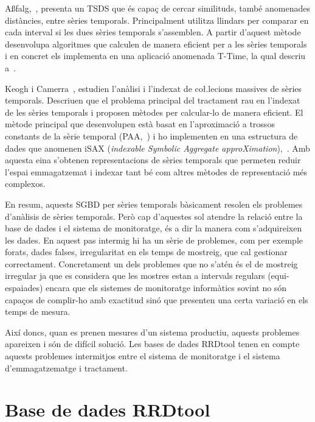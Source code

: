 A{\ss}falg,~\cite{assfalg08:_advan_analy_temp}, presenta un TSDS que és capaç de
cercar similituds, també anomenades distàncies, entre sèries temporals. Principalment utilitza llindars per comparar en cada interval si les dues sèries temporals s'assemblen. A partir d'aquest mètode desenvolupa algoritmes que calculen de manera eficient per a les sèries temporals i en concret els implementa en una aplicació anomenada T-Time, la qual descriu a~\cite{assfalg08:ttime}.

Keogh i Camerra~\cite{keogh08:isax,keogh10:isax}, 
estudien l'anàlisi i l'indexat de co\l.lecions massives de sèries temporals. Descriuen que el problema principal del tractament rau en l'indexat de les sèries temporals i proposen mètodes per calcular-lo de manera eficient. El mètode principal que desenvolupen està basat en l'aproximació a trossos constants de la sèrie temporal (PAA,~\cite{keogh00}) i ho implementen en una estructura de dades que anomenen iSAX (\emph{indexable Symbolic Aggregate approXimation}),~\cite{isax}. Amb aquesta eina s'obtenen representacions de sèries temporals que permeten reduir l'espai emmagatzemat i indexar tant bé com altres mètodes de representació més complexos.




En resum, aquests SGBD per sèries temporals bàsicament resolen els problemes d'anàlisis de sèries temporals.
Però cap d'aquestes sol atendre la relació entre la base de dades i el sistema de monitoratge, és a dir la manera com s'adquireixen les dades. En aquest pas intermig hi ha un sèrie de problemes, com per exemple forats, dades falses, irregularitat en els temps de mostreig, que cal gestionar correctament. Concretament un dels problemes que no s'atén és el de mostreig irregular ja que es considera que les mostres estan a intervals regulars (equi-espaiades) encara que els sistemes de monitoratge informàtics sovint no són capaços de complir-ho amb exactitud sinó que presenten una certa variació en els temps de mesura. 

Així doncs, quan es prenen mesures d'un sistema productiu, aquests problemes apareixen i són de difícil solució.
Les bases de dades RRDtool tenen en compte aquests problemes intermitjos entre el sistema de monitoratge i el sistema d'emmagatzematge i tractament. 






\section{Base de dades RRDtool}

